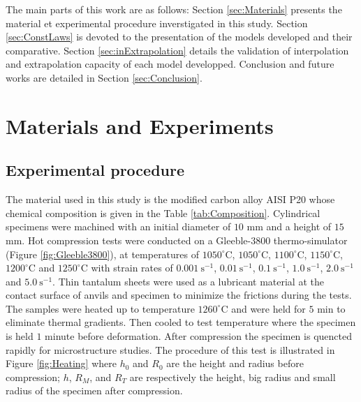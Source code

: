\documentclass[twoside,english,1p,final,sort&compress]{elsarticle}
\theoremstyle{plain}
\begin{document}
The main parts of this work are as follows: Section \ref{sec:Materials} presents the material et experimental procedure inverstigated in this study. Section \ref{sec:ConstLaws} is devoted to the presentation of the models developed and their comparative. Section \ref{sec:inExtrapolation} details the validation of interpolation and extrapolation capacity of each model developped. Conclusion and future works are detailed in Section \ref{sec:Conclusion}.

\section{ Materials and Experiments \label{sec:Materials}}
\subsection{Experimental procedure}
The material used in this study is the modified carbon alloy AISI P20 whose chemical composition is given in the Table \ref{tab:Composition}. Cylindrical specimens were machined with an initial diameter of $10$ mm and a height of $15$ mm. Hot compression tests were conducted on a Gleeble-3800 thermo-simulator (Figure \ref{fig:Gleeble3800}), at temperatures of $1050^\circ$C,  $1050^\circ$C,  $1100^\circ$C,  $1150^\circ$C,  $1200^\circ$C and  $1250^\circ$C with strain rates of $0.001\ \text{s}^{-1}$, $0.01\ \text{s}^{-1}$, $0.1\ \text{s}^{-1}$, $1.0\ \text{s}^{-1}$, $2.0\ \text{s}^{-1}$ and $5.0\ \text{s}^{-1}$. Thin tantalum sheets were used as a lubricant material at the contact surface of anvils and specimen to minimize the frictions during the tests. The samples were heated up to temperature $1260^\circ$C  and were held for $5$ min to eliminate thermal gradients. Then cooled to test temperature where the specimen is held $1$ minute before deformation. After compression the specimen is quencted rapidly for microstructure studies. The procedure of this test is illustrated in Figure \ref{fig:Heating} where $h_0$ and $R_0$ are the height and radius before compression; $h$, $R_M$, and $R_T$ are respectively the height, big radius and small radius of the specimen after compression.
\end{document}
